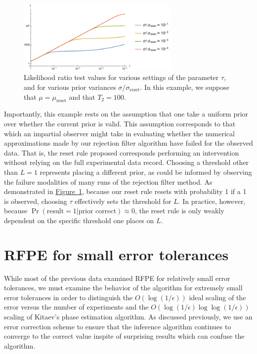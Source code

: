 \documentclass[aps,pra,amsmath,twocolumn,amssymb,superscriptaddress]{revtex4-1}
\newcommand{\reset}{\mathrm{reset}}
\newcommand{\fig}[1]{\hyperref[fig:#1]{Figure~\ref*{fig:#1}}}
\begin{document}
\begin{figure}
    \begin{center}
        \includegraphics[width=0.7\textwidth]{reset-bf-thresholds.pdf}
    \end{center}
    \caption{
        \label{fig:reset-bf-thresholds}
        Likelihood ratio test values for various settings of the parameter
        $\tau$, and for various prior variances $\sigma / \sigma_\reset$.
        In this example, we suppose that $\mu = \mu_\reset$ and that $T_2 = 100$.
    }
\end{figure}

Importantly, this example rests on the assumption that one take a uniform
prior over whether the current prior is valid. This assumption corresponds to
that which an impartial observer might take in evaluating whether the numerical
approximations made by our rejection filter algorithm have failed for the
observed data. That is, the reset rule proposed corresponds performing an intervention
without relying on the full experimental data record. Choosing a threshold
other than $L = 1$ represents placing a different prior, as could be informed by observing
the failure modalities of many runs of the rejection filter method. As
demonstrated in \fig{reset-bf-thresholds}, because our reset rule resets with
probability 1 if a 1 is observed, choosing $\tau$ effectively sets the threshold
for $L$.
In practice,
however, because $\Pr(\text{result} = 1 | \text{prior correct}) \approx 0$, the reset
rule is only weakly dependent on the specific threshold one places on $L$.

\section{RFPE for small error tolerances}
While most of the previous data examined RFPE for relatively small error tolerances, we must examine the behavior of the algorithm for extremely
small error tolerances in order to distinguish the $O(\log(1/\epsilon))$ ideal scaling of the error versus the number of experiments and the
$O(\log(1/\epsilon)\log\log(1/\epsilon))$ scaling of Kitaev's phase estimation algorithm.  As discussed previously, we use an error correction scheme
to ensure that the inference algorithm continues to converge to the correct value inspite of surprising results which can confuse the algorithm.
\end{document}
